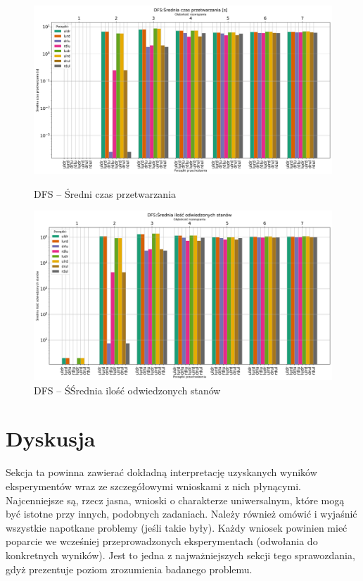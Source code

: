 \documentclass{classrep}
\begin{document}
\begin{figure}[H]
    \includegraphics[width=\textwidth]{charts/DFS_time.png}
    \caption{DFS -- Średni czas przetwarzania}
    \label{DFS:time}
    \includegraphics[width=\textwidth]{charts/DFS_visited.png}
    \caption{DFS -- ŚŚrednia ilość odwiedzonych stanów}
    \label{DFS:time}
\end{figure}



\restoregeometry

\section{Dyskusja}
{\color{blue}
Sekcja ta powinna zawierać dokładną interpretację uzyskanych wyników
eksperymentów wraz ze szczegółowymi wnioskami z nich płynącymi. Najcenniejsze
są, rzecz jasna, wnioski o charakterze uniwersalnym, które mogą być istotne
przy innych, podobnych zadaniach. Należy również omówić i wyjaśnić wszystkie
napotkane problemy (jeśli takie były). Każdy wniosek powinien mieć poparcie we
wcześniej przeprowadzonych eksperymentach (odwołania do konkretnych wyników).
Jest to jedna z najważniejszych sekcji tego sprawozdania, gdyż prezentuje
poziom zrozumienia badanego problemu.}
\end{document}
